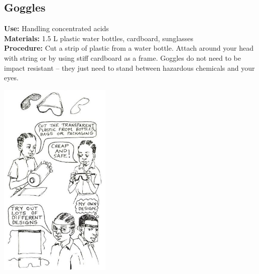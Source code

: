 \begin{multicols}{2}
\section{Goggles}
\label{sec:goggles}
\vspace{-10pt}
\textbf{Use:} Handling concentrated acids\\
\textbf{Materials:} 1.5 L plastic water bottles, cardboard, sunglasses\\
\textbf{Procedure:} Cut a strip of plastic from a water bottle. Attach around your head with string or by using stiff cardboard as a frame. Goggles do not need to be impact resistant -- they just need to stand between hazardous chemicals and your eyes. 
\begin{center}
\includegraphics[width=0.4\textwidth]{./img/source/goggles.jpg}
\end{center}


\end{multicols}

